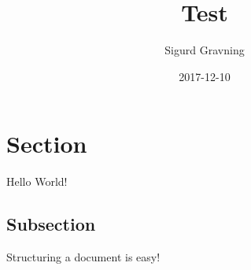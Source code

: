 \documentclass{article}
\title{Test}
\date{2017-12-10}
\author{Sigurd Gravning}
\begin{document}
\maketitle
{}
\newpage

\section{Section}

Hello World!

\subsection{Subsection}

Structuring a document is easy!
\end{document}
